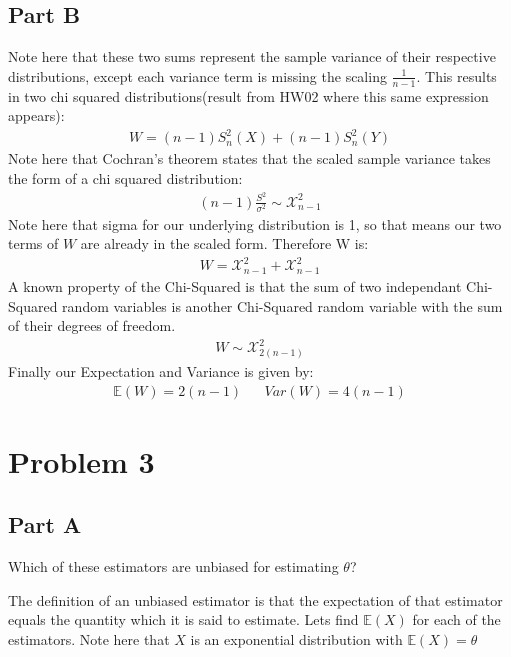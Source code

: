 \documentclass{article}
\begin{document}
\subsection*{Part B}
Note here that these two sums represent the sample variance of their respective distributions, except each variance term is missing the scaling $\frac{1}{n-1}$. This results in two chi squared distributions(result from HW02 where this same expression appears):
\begin{align*}
W=(n-1)S_n^2(X) + (n-1)S_n^2(Y) 
\end{align*}
Note here that Cochran's theorem states that the scaled sample variance takes the form of a chi squared distribution:
\begin{align*}
(n-1)\frac{S^2}{\sigma^2} \sim \mathcal{X}^2_{n-1}
\end{align*}
Note here that sigma for our underlying distribution is 1, so that means our two terms of $W$ are already in the scaled form. Therefore W is:
\begin{align*}
W= \mathcal{X}^2_{n-1} + \mathcal{X}^2_{n-1} 
\end{align*}
A known property of the Chi-Squared is that the sum of two independant Chi-Squared random variables is another Chi-Squared random variable with the sum of their degrees of freedom.
\begin{align*}
W \sim \mathcal{X}^2_{2(n-1)} 
\end{align*}
Finally our Expectation and Variance is given by:
\begin{align*}
\boxed{ \mathbb{E}(W) = 2(n-1) } && \boxed{ Var(W) = 4(n-1) }
\end{align*}


\clearpage
\section*{Problem 3}
\subsection*{Part A}
Which of these estimators are unbiased for estimating $\theta$?

	The definition of an unbiased estimator is that the expectation of that estimator equals the quantity which it is said to estimate. Lets find $\mathbb{E}(X)$ for each of the estimators. Note here that $X$ is an exponential distribution with $\mathbb{E}(X) = \theta$
	
\end{document}
